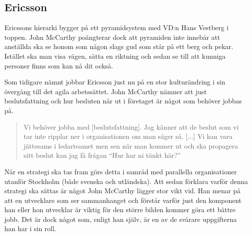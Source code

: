 \subsection{Ericsson}
Ericssons hierarki bygger på ett pyramidsystem med VD:n Hans Vestberg i toppen. John McCarthy poängterar dock att pyramiden inte innebär att anställda ska se honom som någon slags gud som står på ett berg och pekar. Istället ska man visa vägen, sätta en riktning och sedan se till att kunniga personer finns som kan nå dit också.

Som tidigare nämnt jobbar Ericsson just nu på en stor kulturändring i sin övergång till det agila arbetssättet. John McCarthy nämner att just beslutsfattning och hur besluten når ut i företaget är något som behöver jobbas på.

\begin{quote}
Vi behöver jobba med [beslutsfattning]. Jag känner att de beslut som vi tar inte ripplar ner i organisationen om man säger så. [...] Vi kan vara jättesams i ledarteamet men sen när man kommer ut och ska propagera sitt beslut kan jag få frågan ``Hur har ni tänkt här?''
\end{quote}

När en strategi ska tas fram görs detta i samråd med parallella organisationer utanför Stockholm (både svenska och utländska). Att sedan förklara varför denna strategi ska sättas är något John McCarthy lägger stor vikt vid. Han menar på att en utvecklare som ser sammanhanget och förstår varför just den komponent han eller hon utvecklar är viktig för den större bilden kommer göra ett bättre jobb. Det är dock något som, enligt han själv, är en av de svårare uppgifterna han har i sin roll.